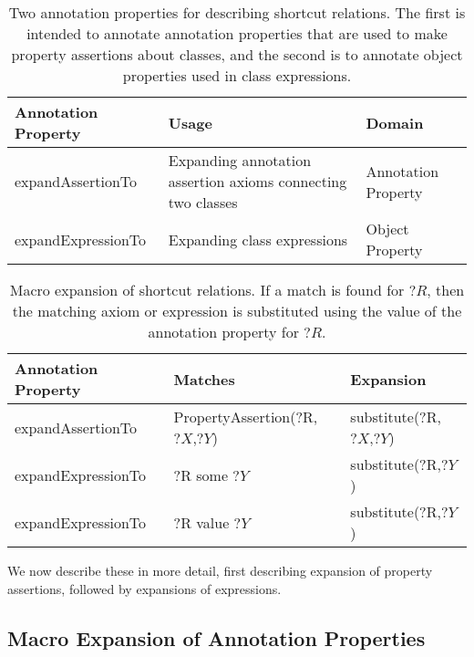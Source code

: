 \documentclass{llncs}
\begin{document}
  \begin{table}
    \begin{tabular}{ | p{3.5cm} | p{4.5cm} | p{4cm} | }
      \hline 
      \textbf{Annotation Property}  & \textbf{Usage} & \textbf{Domain} \\

      \hline
      expandAssertionTo  & Expanding annotation assertion axioms connecting two classes & Annotation Property \\

      \hline
      expandExpressionTo  & Expanding class expressions & Object Property \\

      \hline
    \end{tabular}
    \caption{Two annotation properties for describing shortcut
      relations. The first is intended to annotate annotation
      properties that are used to make property assertions about
      classes, and the second is to annotate object properties used in
      class expressions.}
    \label{tab:macro-defining-props}
  \end{table}

  \begin{table}
    \begin{tabular}{ | p{4cm} | p{5cm} | p{5cm} | }
      \hline 
      \textbf{Annotation Property} & \textbf{Matches} & \textbf{Expansion} \\

      \hline
      expandAssertionTo & PropertyAssertion(?R,$?X$,$?Y$) & substitute(?R,$?X$,$?Y$) \\

      \hline
      expandExpressionTo & ?R some $?Y$ & substitute(?R,$?Y$) \\

      \hline
      expandExpressionTo & ?R value $?Y$ & substitute(?R,$?Y$) \\

      \hline
    \end{tabular}
    \caption{Macro expansion of shortcut relations. If a match is
      found for $?R$, then the matching axiom or expression is
      substituted using the value of the annotation property for $?R$.}
    \label{tab:macro-expansion}
  \end{table}

We now describe these in more detail, first describing expansion of
property assertions, followed by expansions of expressions.

\subsection{Macro Expansion of Annotation Properties}
\end{document}

